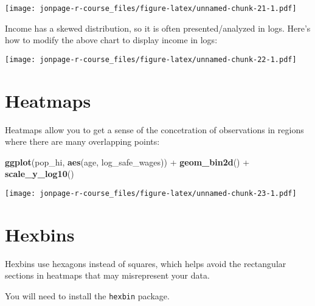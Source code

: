 \documentclass[]{book}
\newenvironment{Shaded}{\begin{snugshade}}{\end{snugshade}}
\newcommand{\KeywordTok}[1]{\textcolor[rgb]{0.13,0.29,0.53}{\textbf{{#1}}}}
\newcommand{\DataTypeTok}[1]{\textcolor[rgb]{0.13,0.29,0.53}{{#1}}}
\newcommand{\DecValTok}[1]{\textcolor[rgb]{0.00,0.00,0.81}{{#1}}}
\newcommand{\StringTok}[1]{\textcolor[rgb]{0.31,0.60,0.02}{{#1}}}
\newcommand{\NormalTok}[1]{{#1}}
\theoremstyle{definition}
\theoremstyle{definition}
\theoremstyle{remark}
\begin{document}
\texttt{[image: jonpage-r-course\_files/figure-latex/unnamed-chunk-21-1.pdf]}

Income has a skewed distribution, so it is often presented/analyzed in
logs. Here's how to modify the above chart to display income in logs:

\begin{Shaded}
\end{Shaded}

\texttt{[image: jonpage-r-course\_files/figure-latex/unnamed-chunk-22-1.pdf]}

\section{Heatmaps}\label{heatmaps}

Heatmaps allow you to get a sense of the concetration of observations in
regions where there are many overlapping points:

\begin{Shaded}
\begin{Highlighting}[]
\KeywordTok{ggplot}\NormalTok{(pop_hi, }\KeywordTok{aes}\NormalTok{(age, log_safe_wages)) +}
\StringTok{  }\KeywordTok{geom_bin2d}\NormalTok{() +}
\StringTok{  }\KeywordTok{scale_y_log10}\NormalTok{()}
\end{Highlighting}
\end{Shaded}

\texttt{[image: jonpage-r-course\_files/figure-latex/unnamed-chunk-23-1.pdf]}

\section{Hexbins}\label{hexbins}

Hexbins use hexagons instead of squares, which helps avoid the
rectangular sections in heatmaps that may misrepresent your data.

You will need to install the \texttt{hexbin} package.
\end{document}
